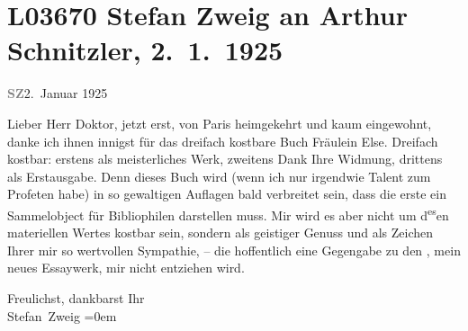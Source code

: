 

\section[Stefan Zweig an Arthur Schnitzler, 2. 1. 1925]{L03670 Stefan Zweig an Arthur Schnitzler, 2. 1. 1925}
\nopagebreak{}
\rehead{ }\normalsize\beginnumbering{}
\toendnotes[C]{\smallbreak\pagebreak[2]}
\toendnotes[C]{\smallbreak}
\pstart
           {\pb}\textcolor{gray}{\textbf{SZ}}\hfill 2. Januar 1925\pend
           
\pstart
           \raggedleft{}\pend
           \vspace{0.5em}
\pstart
           Lieber Herr Doktor, jetzt erst, von Paris heimgekehrt und kaum eingewohnt, danke ich ihnen innigst für das
               dreifach kostbare Buch Fräulein Else. Dreifach
               kostbar: erstens als meisterliches Werk, zweitens Dank Ihre Widmung, drittens als
               Erstausgabe. Denn dieses Buch wird (wenn ich nur irgendwie Talent zum Profeten habe)
               in so gewaltigen Auflagen bald verbreitet sein, dass die erste ein Sammelobject {\pb}für Bibliophilen darstellen muss. Mir wird
               es aber nicht um d\substVorne{}\textsuperscript{es}\substDazwischen{}en\substHinten{} materiellen Wertes kostbar sein, sondern als geistiger Genuss und als
               Zeichen Ihrer mir so wertvollen Sympathie, – die hoffentlich eine Gegengabe zu den
                  \label{K_L03670-1v}\label{K_L03670-1},
               mein neues Essaywerk, mir
               nicht entziehen wird. \pend
           
\pstart
           Freulichst, dankbarst Ihr{\\[\baselineskip]}\spacefill\mbox{Stefan Zweig}\pend
           \leftskip=0em{}\endnumbering{}
\begin{anhang}
\end{anhang}
      